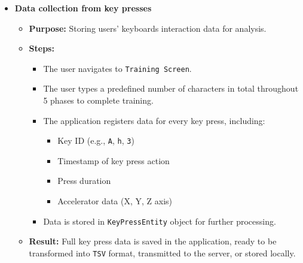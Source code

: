 \begin{itemize}
	\item \textbf{Data collection from key presses}
	\begin{itemize}
		\item \textbf{Purpose:} Storing users' keyboards interaction data for analysis.
		\item \textbf{Steps:}
		\begin{itemize}
			\item The user navigates to \texttt{Training Screen}.
			\item The user types a predefined number of characters in total throughout 5 phases to complete training.
			\item The application registers data for every key press, including:
			\begin{itemize}
				\item Key ID (e.g., \texttt{A}, \texttt{h}, \texttt{3})
				\item Timestamp of key press action
				\item Press duration
				\item Accelerator data (X, Y, Z axis)
			\end{itemize}
			\item Data is stored in \texttt{KeyPressEntity} object for further processing.
		\end{itemize}
		\item \textbf{Result:} Full key press data is saved in the application, ready to be transformed into \texttt{TSV} format, transmitted to the server, or stored locally.
	\end{itemize}
	

\end{itemize}
